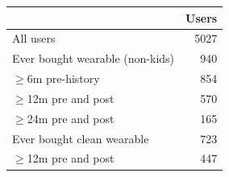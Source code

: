 \begin{tabular}{lr}
\toprule
 & Users \\
\midrule
All users & 5027 \\
Ever bought wearable (non-kids) & 940 \\
\quad $\geq$6m pre-history & 854 \\
\quad $\geq$12m pre and post & 570 \\
\quad $\geq$24m pre and post & 165 \\
Ever bought clean wearable & 723 \\
\quad $\geq$12m pre and post & 447 \\
\bottomrule
\end{tabular}

